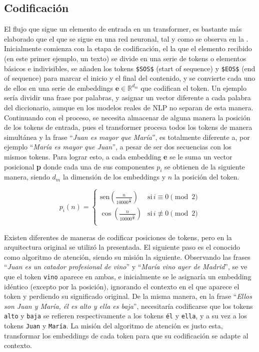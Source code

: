 			\subsection{Codificación}
			
				El flujo que sigue un elemento de entrada en un transformer, es bastante más elaborado que el que se sigue en una red neuronal, tal y como se observa en la . Inicialmente comienza con la etapa de codificación, el la que el elemento recibido (en este primer ejemplo, un texto) se divide en una serie de tokens o elementos básicos e indivisibles, se añaden los tokens \texttt{\$SOS\$} (start of sequence) y \texttt{\$EOS\$} (end of sequence) para marcar el inicio y el final del contenido, y se convierte cada uno de ellos en una serie de embeddings $\textbf{e} \in \mathbb{R}^{d_m}$ que codifican el token. Un ejemplo sería dividir una frase por palabras, y asignar un vector diferente a cada palabra del diccionario, aunque en los modelos reales de NLP no separan de esta manera. Continuando con el proceso, se necesita almacenar de alguna manera la posición de los tokens de entrada, pues el transformer procesa todos los tokens de manera simultánea y la frase ``\textit{Juan es mayor que María}'', es totalmente diferente a, por ejemplo ``\textit{María es mayor que Juan}'', a pesar de ser dos secuencias con los mismos tokens. Para lograr esto, a cada embedding \textbf{e} se le suma un vector posicional \textbf{p} donde cada una de sus componentes $p_i$ se obtienen de la siguiente manera, siendo $d_m$ la dimensión de los embeddings y $n$ la posición del token. 
				
				$$
				p_i(n) = \begin{cases}
					\text{sen}\left(\frac{n}{10000^{\frac{2i}{d}}}\right) & \text{si}\, i \equiv 0 \pmod{2}\\
					\cos\left(\frac{n}{10000^{\frac{2i}{d}}}\right) & \text{si}\, i \not\equiv 0 \pmod{2}\\
					\end{cases}
				$$
				
				Existen diferentes de maneras de codificar posiciones de tokens, pero en la arquitectura original se utilizó la presentada. El siguiente paso es el conocido como algoritmo de atención, siendo su misión la siguiente. Observando las frases ``\textit{Juan es un catador profesional de vino}'' y ``\textit{María vino ayer de Madrid}'', se ve que el token \texttt{vino} aparece en ambas, e inicialmente se le asignaría un embedding idéntico (excepto por la posición), ignorando el contexto en el que aparece el token y perdiendo su significado original. De la misma manera, en la frase ``\textit{Ellos son Juan y María, él es alto y ella es baja}'', necesitaría codificarse que los tokens \texttt{alto} y \texttt{baja} se refieren respectivamente a los tokens \texttt{él} y \texttt{ella}, y a su vez a los tokens \texttt{Juan} y \texttt{María}. La misión del algoritmo de atención es justo esta, transformar los embeddings de cada token para que su codificación se adapte al contexto. \\
				
